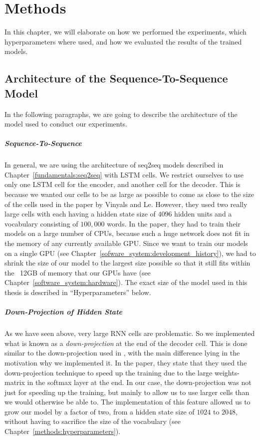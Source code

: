 \chapter{Methods}
\label{methods}
In this chapter, we will elaborate on how we performed the experiments, which hyperparameters where used, and how we evaluated the results of the trained models.

\section{Architecture of the Sequence-To-Sequence Model}
\label{methods:architecture}
In the following paragraphs, we are going to describe the architecture of the model used to conduct our experiments.

\paragraph{Sequence-To-Sequence} In general, we are using the architecture of seq2seq models described in Chapter~\ref{fundamentals:seq2seq} with LSTM cells. We restrict ourselves to use only one LSTM cell for the encoder, and another cell for the decoder. This is because we wanted our cells to be as large as possible to come as close to the size of the cells used in the paper by Vinyals and Le\cite{Vinyals:2015}. However, they used two really large cells with each having a hidden state size of $4096$ hidden units and a vocabulary consisting of $100,000$ words. In the paper, they had to train their models on a large number of CPUs, because such a huge network does not fit in the memory of any currently available GPU. Since we want to train our models on a single GPU (see Chapter~\ref{sofware_system:development_history}), we had to shrink the size of our model to the largest size possible so that it still fits within the ~12GB of memory that our GPUs have (see Chapter~\ref{software_system:hardware}). The exact size of the model used in this thesis is described in ``Hyperparameters'' below.

\paragraph{Down-Projection of Hidden State} As we have seen above, very large RNN cells are problematic. So we implemented what is known as a \emph{down-projection} at the end of the decoder cell. This is done similar to the down-projection used in \cite{Vinyals:2015}, with the main difference lying in the motivation why we implemented it. In the paper, they state that they used the down-projection technique to speed up the training due to the large weights-matrix in the softmax layer at the end. In our case, the down-projection was not just for speeding up the training, but mainly to allow us to use larger cells than we would otherwise be able to. The implementation of this feature allowed us to grow our model by a factor of two, from a hidden state size of $1024$ to $2048$, without having to sacrifice the size of the vocabulary (see Chapter~\ref{methods:hyperparameters}).

